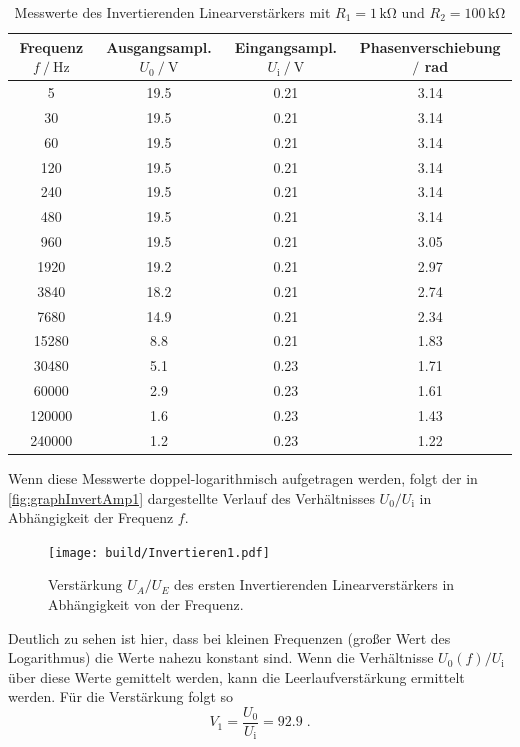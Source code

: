 \begin{table}
    \centering
    \caption{Messwerte des Invertierenden Linearverstärkers mit $R_1=1\,\unit{\kilo\ohm}$ und $R_2=100\,\unit{\kilo\ohm}$}
    \begin{tabular}{c c c c}
        \toprule
        Frequenz $f\mathbin{/}\unit{\hertz}$ & Ausgangsampl. $U_0\mathbin{/}\unit{\volt}$& Eingangsampl. $U_{\text{i}}\mathbin{/}\unit{\volt}$ & Phasenverschiebung $\mathbin{/}$ rad\\
        \midrule
        5	&19.5	&0.21&	3.14\\
        30&	19.5	&0.21&	3.14\\
        60&	19.5	&0.21&	3.14\\
        120&	19.5&	0.21&	3.14\\
        240&	19.5&	0.21&	3.14\\
        480	&19.5	&0.21&	3.14\\
        960	&19.5	&0.21&	3.05\\
        1920&	19.2&	0.21&	2.97\\
        3840&	18.2&	0.21&	2.74\\
        7680&	14.9&	0.21&	2.34\\
        15280&	8.8&	0.21&	1.83\\
        30480&	5.1	&0.23& 1.71\\
        60000&	2.9	&0.23&	1.61\\
        120000&	1.6	&0.23&	1.43\\
        240000&	1.2	&0.23&	1.22\\
        \bottomrule
    \end{tabular}
    \label{tab:InvAmp1}
\end{table}
Wenn diese Messwerte doppel-logarithmisch aufgetragen werden, folgt der in \autoref{fig:graphInvertAmp1} dargestellte Verlauf des Verhältnisses $U_0/U_{\text{i}}$ in Abhängigkeit der Frequenz $f$.

\begin{figure}
    \centering
    \texttt{[image: build/Invertieren1.pdf]}
    \caption{Verstärkung $U_A/U_E$ des ersten Invertierenden Linearverstärkers in Abhängigkeit von der Frequenz.}
    \label{fig:inv1plot}
\end{figure}
Deutlich zu sehen ist hier, dass bei kleinen Frequenzen (großer Wert des Logarithmus) die Werte nahezu konstant sind. Wenn  die Verhältnisse $U_0(f)/U_{\text{i}}$ über diese  Werte gemittelt werden, kann die Leerlaufverstärkung ermittelt werden.
Für die Verstärkung folgt so 
\begin{equation*}
    V_1=\frac{U_0}{U_{\text{i}}}= 92.9  \; .
\end{equation*}

